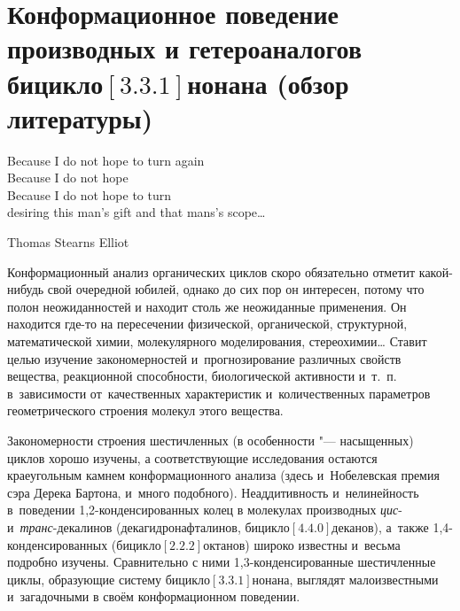 \chapter{Конформационное поведение производных и гетероаналогов
бицикло$[3.3.1]$нонана (обзор литературы)}\label{ch:Review:Basics}

\epigraph{Because I do not hope to turn again \\ Because I do not hope \\
Because I do not hope to turn \\ desiring this man's gift and that mans's
scope\dots}{Thomas Stearns Elliot}

Конформационный анализ органических циклов скоро обязательно отметит какой-нибудь свой очередной юбилей, однако до сих пор он интересен, потому что полон неожиданностей и находит столь же неожиданные применения. Он находится где-то на пересечении физической, органической, структурной, математической химии, молекулярного моделирования, стереохимии\dots
Ставит целью изучение закономерностей и~прогнозирование различных свойств вещества, реакционной способности, биологической активности и~т.~п. в~зависимости от~качественных характеристик и~количественных параметров геометрического строения молекул этого вещества.

Закономерности строения шестичленных (в особенности "--- насыщенных) циклов
хорошо изучены, а соответствующие исследования остаются краеугольным камнем
конформационного анализа (здесь и~Нобелевская премия сэра Дерека Бартона,
и~много подобного). Неаддитивность и~нелинейность в~поведении
1,2-конденсированных колец в молекулах производных \emph{цис}-
и~\emph{транс}-декалинов (декагидронафталинов, бицикло$[4.4.0]$деканов),
а~также 1,4-конденсированных (бицикло$[2.2.2]$октанов) широко известны и~весьма
подробно изучены. Сравнительно с ними 1,3-конденсированные шестичленные циклы,
образующие систему бицикло$[3.3.1]$нонана, выглядят малоизвестными
и~загадочными в своём конформационном поведении.


